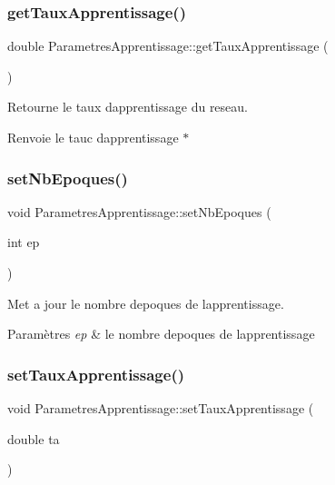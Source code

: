 \subsubsection{\texorpdfstring{get\+Taux\+Apprentissage()}{getTauxApprentissage()}}
{\footnotesize\ttfamily double Parametres\+Apprentissage\+::get\+Taux\+Apprentissage (\begin{DoxyParamCaption}{ }\end{DoxyParamCaption})}



Retourne le taux d\textquotesingle{}apprentissage du reseau. 

\begin{DoxyReturn}{Renvoie}
le tauc d\textquotesingle{}apprentissage $\ast$ 
\end{DoxyReturn}
\mbox{\label{class_parametres_apprentissage_a0b424fc552461e9e13d51024bd071470}} 
\subsubsection{\texorpdfstring{set\+Nb\+Epoques()}{setNbEpoques()}}
{\footnotesize\ttfamily void Parametres\+Apprentissage\+::set\+Nb\+Epoques (\begin{DoxyParamCaption}\item[{int}]{ep }\end{DoxyParamCaption})}



Met a jour le nombre d\textquotesingle{}epoques de l\textquotesingle{}apprentissage. 


\begin{DoxyParams}{Paramètres}
{\em ep} & le nombre d\textquotesingle{}epoques de l\textquotesingle{}apprentissage \\
\hline
\end{DoxyParams}
\mbox{\label{class_parametres_apprentissage_a13b6b90a24b4733c6b465aa74a1abda9}} 
\subsubsection{\texorpdfstring{set\+Taux\+Apprentissage()}{setTauxApprentissage()}}
{\footnotesize\ttfamily void Parametres\+Apprentissage\+::set\+Taux\+Apprentissage (\begin{DoxyParamCaption}\item[{double}]{ta }\end{DoxyParamCaption})}



